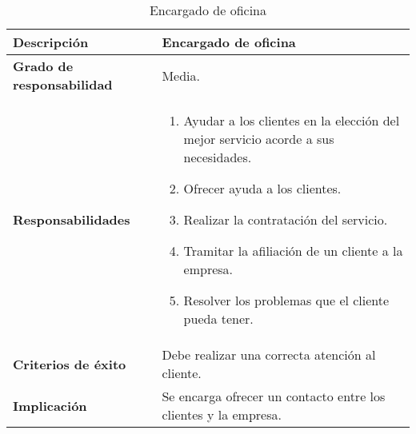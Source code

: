 \documentclass[12pt,spanish]{article}
\begin{document}

\begin{table}[H]
\begin{center}
\begin{tabular}{|l|m{9.5cm}|}
\hline
\textbf{Descripción} & Encargado de oficina \\
\hline
\textbf{Grado de responsabilidad} & Media. \\
\hline
\textbf{Responsabilidades} & 
\begin{minipage}{9.5cm}
    \vskip 1pt
    \begin{enumerate}
   		\item Ayudar a los clientes en la elección del mejor servicio acorde a sus necesidades.
   		\item Ofrecer ayuda a los clientes.
   		\item Realizar la contratación del servicio.
   		\item Tramitar la afiliación de un cliente a la empresa.
   		\item Resolver los problemas que el cliente pueda tener.
   \end{enumerate}
   \vskip 1pt
 \end{minipage}\\ 
\hline
\textbf{Criterios de éxito} & Debe realizar una correcta atención al cliente.\\
\hline
\textbf{Implicación} & Se encarga ofrecer un contacto entre los clientes y la empresa. \\
\hline
\end{tabular}
\caption{Encargado de oficina}
\end{center}
\end{table}
\end{document}
